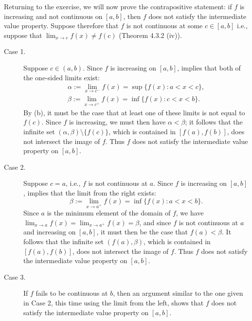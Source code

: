 \documentclass{lew98_solutions}
\begin{document}
\begin{solution}
    Returning to the exercise, we will now prove the contrapositive statement: if \( f \) is increasing and not continuous on \( [a, b] \), then \( f \) does not satisfy the intermediate value property. Suppose therefore that \( f \) is not continuous at some \( c \in [a, b] \) i.e., suppose that \( \lim_{x \to c} f(x) \neq f(c) \) (Theorem 4.3.2 (iv)).
    \begin{description}
        \item[Case 1.] Suppose \( c \in (a, b) \). Since \( f \) is increasing on \( [a, b] \),  implies that both of the one-sided limits exist:
        \begin{gather*}
            \alpha := \lim_{x \to c^-} f(x) = \sup \{ f(x) : a < x < c \}, \\[2mm]
            \beta := \lim_{x \to c^+} f(x) = \inf \{ f(x) : c < x < b \}.
        \end{gather*}
        By  (b), it must be the case that at least one of these limits is not equal to \( f(c) \). Since \( f \) is increasing, we must then have \( \alpha < \beta \); it follows that the infinite set \( (\alpha, \beta) \setminus \{ f(c) \} \), which is contained in \( [f(a), f(b)] \), does not intersect the image of \( f \). Thus \( f \) does not satisfy the intermediate value property on \( [a, b] \).

        \item[Case 2.] Suppose \( c = a \), i.e., \( f \) is not continuous at \( a \). Since \( f \) is increasing on \( [a, b] \),  implies that the limit from the right exists:
        \[
            \beta := \lim_{x \to a^+} f(x) = \inf \{ f(x) : a < x < b \}.
        \]
        Since \( a \) is the minimum element of the domain of \( f \), we have \( \lim_{x \to a} f(x) = \lim_{x \to a^+} f(x) = \beta \), and since \( f \) is not continuous at \( a \) and increasing on \( [a, b] \), it must then be the case that \( f(a) < \beta \). It follows that the infinite set \( (f(a), \beta) \), which is contained in \( [f(a), f(b)] \), does not intersect the image of \( f \). Thus \( f \) does not satisfy the intermediate value property on \( [a, b] \).

        \item[Case 3.] If \( f \) fails to be continuous at \( b \), then an argument similar to the one given in Case 2, this time using the limit from the left, shows that \( f \) does not satisfy the intermediate value property on \( [a, b] \).
    \end{description}
\end{solution}
\end{document}
